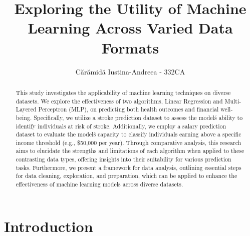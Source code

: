 \documentclass[runningheads]{paper}
\begin{document}
%
\title{Exploring the Utility of Machine Learning Across Varied Data Formats}
%
\author{Cărămidă Iustina-Andreea - 332CA}
%
%
\maketitle              %
%
\begin{abstract}
    This study investigates the applicability of machine learning techniques on 
    diverse datasets. We explore the effectiveness of two algorithms, Linear 
    Regression and Multi-Layered Perceptron (MLP), on predicting both health 
    outcomes and financial well-being. Specifically, we utilize a stroke 
    prediction dataset to assess the model\'s ability to identify individuals at 
    risk of stroke. Additionally, we employ a salary prediction dataset to 
    evaluate the model\'s capacity to classify individuals earning above a 
    specific income threshold (e.g., \$50,000 per year). Through comparative 
    analysis, this research aims to elucidate the strengths and limitations of 
    each algorithm when applied to these contrasting data types, offering 
    insights into their suitability for various prediction tasks. Furthermore, 
    we present a framework for data analysis, outlining essential steps for data
    cleaning, exploration, and preparation, which can be applied to enhance the 
    effectiveness of machine learning models across diverse datasets.


\end{abstract}
\section{Introduction}
\end{document}
